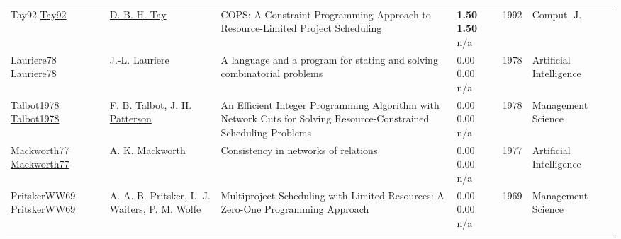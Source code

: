 {\begin{longtable}{p{3cm}p{5cm}p{10cm}p{1cm}rp{2.5cm}l}
Tay92 \href{}{Tay92} & \hyperref[auth:a700]{D. B. H. Tay} & {COPS:} {A} Constraint Programming Approach to Resource-Limited Project Scheduling & \noindent{}\textbf{1.50} \textbf{1.50} n/a & 1992 & Comput. J. & \cite{Tay92}\\
Lauriere78 \href{http://dx.doi.org/10.1016/0004-3702(78)90029-2}{Lauriere78} & J.-L. Lauriere & A language and a program for stating and solving combinatorial problems & \noindent{}\textcolor{black!50}{0.00} \textcolor{black!50}{0.00} n/a & 1978 & Artificial Intelligence & \cite{Lauriere78}\\
Talbot1978 \href{http://dx.doi.org/10.1287/mnsc.24.11.1163}{Talbot1978} & \hyperref[auth:a1495]{F. B. Talbot}, \hyperref[auth:a1496]{J. H. Patterson} & An Efficient Integer Programming Algorithm with Network Cuts for Solving Resource-Constrained Scheduling Problems & \noindent{}\textcolor{black!50}{0.00} \textcolor{black!50}{0.00} n/a & 1978 & Management Science & \cite{Talbot1978}\\
Mackworth77 \href{http://dx.doi.org/10.1016/0004-3702(77)90007-8}{Mackworth77} & A. K. Mackworth & Consistency in networks of relations & \noindent{}\textcolor{black!50}{0.00} \textcolor{black!50}{0.00} n/a & 1977 & Artificial Intelligence & \cite{Mackworth77}\\
PritskerWW69 \href{http://dx.doi.org/10.1287/mnsc.16.1.93}{PritskerWW69} & A. A. B. Pritsker, L. J. Waiters, P. M. Wolfe & Multiproject Scheduling with Limited Resources: A Zero-One Programming Approach & \noindent{}\textcolor{black!50}{0.00} \textcolor{black!50}{0.00} n/a & 1969 & Management Science & \cite{PritskerWW69}\\
\end{longtable}
}

